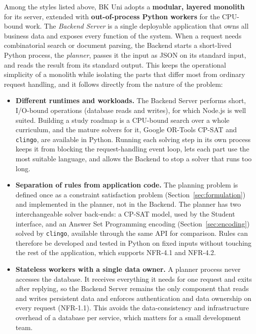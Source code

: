 Among the styles listed above, BK Uni adopts a \textbf{modular, layered monolith} for its server, extended with \textbf{out-of-process Python workers} for the CPU-bound work. The \emph{Backend Server} is a single deployable application that owns all business data and exposes every function of the system. When a request needs combinatorial search or document parsing, the Backend starts a short-lived Python process, the \emph{planner}, passes it the input as JSON on its standard input, and reads the result from its standard output. This keeps the operational simplicity of a monolith while isolating the parts that differ most from ordinary request handling, and it follows directly from the nature of the problem:
\begin{itemize}
    \item \textbf{Different runtimes and workloads.} The Backend Server performs short, I/O-bound operations (database reads and writes), for which Node.js is well suited. Building a study roadmap is a CPU-bound search over a whole curriculum, and the mature solvers for it, Google OR-Tools CP-SAT and \texttt{clingo}, are available in Python. Running each solving step in its own process keeps it from blocking the request-handling event loop, lets each part use the most suitable language, and allows the Backend to stop a solver that runs too long.
    \item \textbf{Separation of rules from application code.} The planning problem is defined once as a constraint satisfaction problem (Section~\ref{sec:formulation}) and implemented in the planner, not in the Backend. The planner has two interchangeable solver back-ends: a CP-SAT model, used by the Student interface, and an Answer Set Programming encoding (Section~\ref{sec:encoding}) solved by \texttt{clingo}, available through the same API for comparison. Rules can therefore be developed and tested in Python on fixed inputs without touching the rest of the application, which supports NFR-4.1 and NFR-4.2.
    \item \textbf{Stateless workers with a single data owner.} A planner process never accesses the database. It receives everything it needs for one request and exits after replying, so the Backend Server remains the only component that reads and writes persistent data and enforces authentication and data ownership on every request (NFR-1.1). This avoids the data-consistency and infrastructure overhead of a database per service, which matters for a small development team.
\end{itemize}

